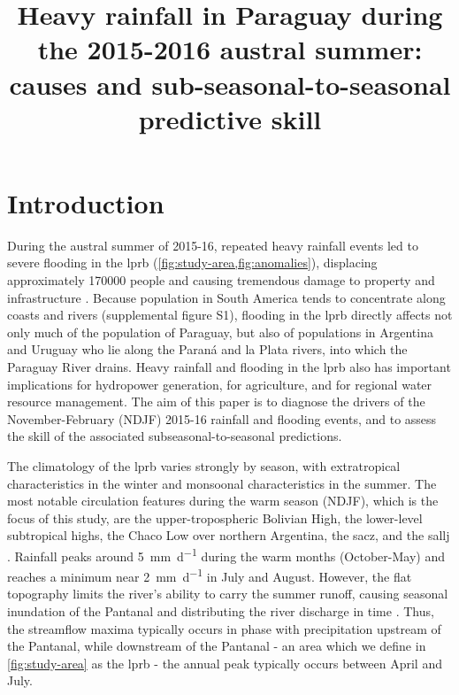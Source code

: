 \documentclass{ametsoc}
\title{Heavy rainfall in Paraguay during the 2015-2016 austral summer: causes and sub-seasonal-to-seasonal predictive skill}
\affiliation{Columbia Water Center. Dept. of Earth and Environmental Engineering, Columbia University, 500 W. 120th St., New York, NY. USA \\ Columbia Water Center, Columbia University, 500 W. 120th St., New York, NY. USA}
\begin{document}
\maketitle

\section{Introduction}

During the austral summer of 2015-16, repeated heavy rainfall events led to severe flooding in the \gls{lprb} (\cref{fig:study-area,fig:anomalies}), displacing approximately \num{170000} people \citep{Brakenridge2016} and causing tremendous damage to property and infrastructure \citep{MinisteriodeObrasPublicasyComunicacion2016}.
Because population in South America tends to concentrate along coasts and rivers (supplemental figure S1), flooding in the \gls{lprb} directly affects not only much of the population of Paraguay, but also of populations in Argentina and Uruguay who lie along the Paran\'{a} and la Plata rivers, into which the Paraguay River drains.
Heavy rainfall and flooding in the \gls{lprb} also has important implications for hydropower generation, for agriculture, and for regional water resource management.
The aim of this paper is to diagnose the drivers of the November-February (NDJF) 2015-16 rainfall and flooding events, and to assess the skill of the associated subseasonal-to-seasonal predictions.

The climatology of the \gls{lprb} varies strongly by season, with extratropical characteristics in the winter and monsoonal characteristics in the summer.
The most notable circulation features during the warm season (NDJF), which is the focus of this study, are the upper-tropospheric Bolivian High, the lower-level subtropical highs, the Chaco Low over northern Argentina, the \gls{sacz}, and the \gls{sallj} \citep{Grimm2009,Marengo2012}.
Rainfall peaks around \SI{5}{\milli\meter\per\day} during the warm months (October-May) and reaches a minimum near \SI{2}{\milli\meter\per\day} in July and August.
However, the flat topography limits the river's ability to carry the summer runoff, causing seasonal inundation of the Pantanal and distributing the river discharge in time \citep{Bravo2011,Barros2004}.
Thus, the streamflow maxima typically occurs in phase with precipitation upstream of the Pantanal, while downstream of the Pantanal - an area which we define in \cref{fig:study-area} as the \acrlong{lprb} - the annual peak typically occurs between April and July.
\end{document}
